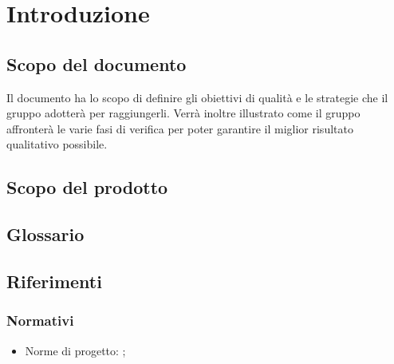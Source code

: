 \documentclass[PdQ.tex]{subfiles}
\begin{document}
\section{Introduzione}
	\subsection{Scopo del documento}
		Il documento ha lo scopo di definire gli obiettivi di qualità e le strategie che il gruppo \GRUPPO{}
		adotterà per raggiungerli. Verrà inoltre illustrato come il gruppo affronterà le varie fasi di verifica
		per poter garantire il miglior risultato qualitativo possibile.
	\subsection{Scopo del prodotto}
		\SCOPO
	\subsection{Glossario}
		\GLOSSARIO
	\subsection{Riferimenti}
		\subsubsection{Normativi}
			\begin{itemize}
				\item Norme di progetto: \NPdoc{};
			\end{itemize}
\end{document}
